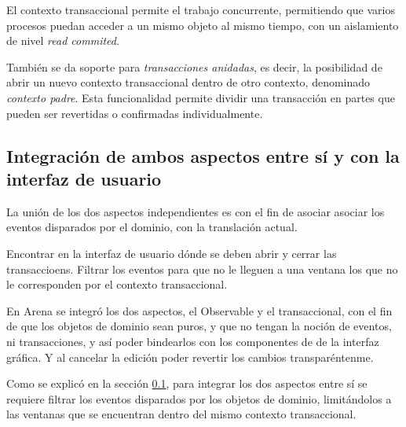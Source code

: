 	El contexto transaccional permite el trabajo concurrente, permitiendo que
	varios procesos puedan acceder a un mismo objeto al mismo
	tiempo, con un aislamiento de nivel \emph{read commited}.
	 
	También se da soporte para \emph{transacciones anidadas}, es decir, la
	posibilidad de abrir un nuevo contexto transaccional dentro de otro contexto,
	denominado \emph{contexto padre}.
	Esta funcionalidad permite dividir una transacción en partes que pueden ser
	revertidas o confirmadas individualmente.
	
\subsection{Integración de ambos aspectos entre sí y con la interfaz de usuario}
\label{sec:Union}
La unión de los dos aspectos independientes es con el fin de asociar asociar los
eventos disparados por el dominio, con la translación actual.
 
Encontrar en la interfaz de usuario dónde se deben abrir y cerrar las
transaccioens.
Filtrar los eventos para que no le lleguen a una ventana los que no le
corresponden por el contexto transaccional.

	 En Arena se integró los dos aspectos, el Observable y
	el transaccional, con el fin de que los objetos de dominio sean puros, y que no tengan la noción de
	eventos, ni transacciones, y así poder bindearlos con los componentes de de la
	interfaz gráfica. Y al cancelar la edición poder revertir los cambios
	transparéntenme.

	Como se explicó en la sección \ref{sec:Union}, para integrar los dos aspectos
	entre sí se requiere filtrar los eventos disparados por los objetos de dominio, 
	limitándolos a las ventanas que se encuentran dentro del mismo contexto
	transaccional.